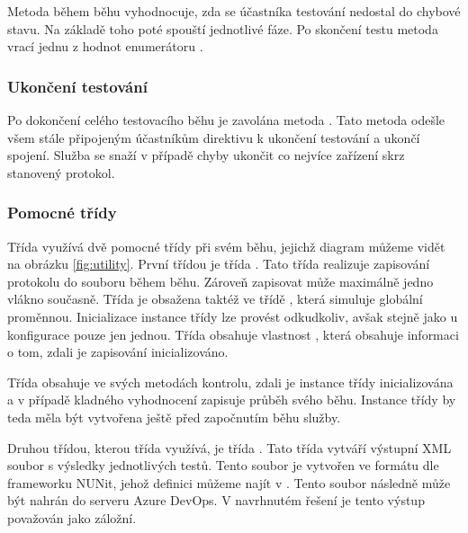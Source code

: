 Metoda během běhu vyhodnocuje, zda se účastníka testování nedostal do chybové stavu. Na základě toho poté spouští jednotlivé fáze. Po skončení testu metoda vrací jednu z hodnot enumerátoru . 

\subsubsection{Ukončení testování}

Po dokončení celého testovacího běhu je zavolána metoda . Tato metoda odešle všem stále připojeným účastníkům direktivu k ukončení testování a ukončí spojení. Služba se snaží v případě chyby ukončit co nejvíce zařízení skrz stanovený protokol.

\subsubsection{Pomocné třídy}
Třída  využívá dvě pomocné třídy při svém běhu, jejichž diagram můžeme vidět na obrázku \ref{fig:utility}. První třídou je třída . Tato třída realizuje zapisování protokolu do souboru během běhu. Zároveň zapisovat může maximálně jedno vlákno současně. Třída je obsažena taktéž ve třídě , která simuluje globální proměnnou. Inicializace instance třídy  lze provést odkudkoliv, avšak stejně jako u konfigurace pouze jen jednou. Třída  obsahuje vlastnost , která obsahuje informaci o tom, zdali je zapisování inicializováno.  

Třída  obsahuje ve svých metodách kontrolu, zdali je instance třídy  inicializována a v případě kladného vyhodnocení zapisuje průběh svého běhu. Instance třídy  by teda měla být vytvořena ještě před započnutím běhu služby.

Druhou třídou, kterou třída  využívá, je třída . Tato třída vytváří výstupní XML soubor s výsledky jednotlivých testů.
Tento soubor je vytvořen ve formátu dle frameworku NUNit, jehož definici můžeme najít v \cite{nunit}. Tento soubor následně může být nahrán do serveru Azure DevOps. V navrhnutém řešení je tento výstup považován jako záložní.

